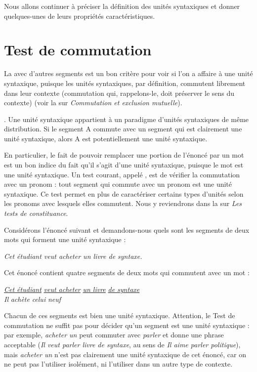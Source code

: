 Nous allons continuer à préciser la définition des unités syntaxiques et donner quelques-unes de leurs propriétés caractéristiques.

\section{Test de commutation}\label{sec:3.2.10}\largerpage

La  avec d’autres segments est un bon critère pour voir si l’on a affaire à une unité syntaxique, puisque les unités syntaxiques, par définition, commutent librement dans leur contexte (commutation qui, rappelons-le, doit préserver le sens du contexte) (voir la  sur \textit{Commutation et exclusion mutuelle}).

{. Une unité syntaxique appartient à un paradigme d’unités syntaxiques de même distribution. Si le segment A commute avec un segment qui est clairement une unité syntaxique, alors A est potentiellement une unité syntaxique.}

En particulier, le fait de pouvoir remplacer une portion de l’énoncé par un mot est un bon indice du fait qu’il s’agit d’une unité syntaxique, puisque le mot est une unité syntaxique. Un test courant, appelé , est de vérifier la commutation avec un pronom : tout segment qui commute avec un pronom est une unité syntaxique. Ce test permet en plus de caractériser certains types d’unités selon les pronoms avec lesquels elles commutent. Nous y reviendrons dans la  sur \textit{Les tests de constituance}.

Considérons l’énoncé suivant et demandons-nous quels sont les segments de deux mots qui forment une unité syntaxique :

\ea\label{ex:livredesyntaxe}
    \textit{Cet étudiant veut acheter un livre de syntaxe.}
\z

Cet énoncé contient quatre segments de deux mots qui commutent avec un mot :

\ea\label{ex:3:2:9:star}\relax
{\let\eachwordone\normalfont
\gll \uline{\textit{Cet étudiant}}  \uline{\textit{veut acheter}}  \uline{\textit{un livre}}  \uline{\textit{de syntaxe}}\\
     \textit{Il}  \textit{achète}  \textit{celui}  \textit{neuf}\\}
\z

Chacun de ces segments est bien une unité syntaxique. Attention, le Test de commutation ne suffit pas pour décider qu'un segment est une unité syntaxique : par exemple, \textit{acheter un} peut commuter avec \textit{parler} et donne une phrase acceptable (\textit{Il veut parler livre de syntaxe}, au sens de \textit{Il aime parler politique}), mais \textit{acheter un} n’est pas clairement une unité syntaxique de cet énoncé, car on ne peut pas l’utiliser isolément, ni l’utiliser dans un autre type de contexte.

